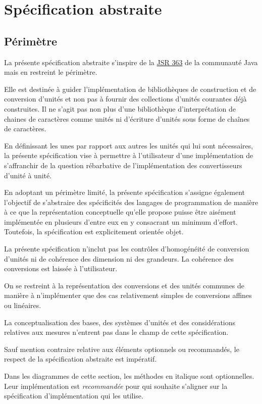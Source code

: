 \documentclass[a4paper,twoside,10pt]{article}
\begin{document}
\section{Spécification abstraite}

\subsection{Périmètre}

La présente spécification abstraite s'inspire de la \href{https://jcp.org/en/jsr/detail?id=363}{JSR 363} de la
communauté Java mais en restreint le périmètre.

Elle est destinée à guider l'implémentation de bibliothèques de construction et de conversion d'unités et non pas à
fournir des collections d'unités courantes déjà construites. Il ne s'agit pas non plus d'une bibliothèque
d'interprétation de chaines de caractères comme unités ni d'écriture d'unités sous forme de chaînes de caractères.

En définissant les unes par rapport aux autres les unités qui lui sont nécessaires, la présente spécification vise à
permettre à l'utilisateur d'une implémentation de s'affranchir de la question rébarbative de l'implémentation des
convertisseurs d'unité à unité.

En adoptant un périmètre limité, la présente spécification s'assigne également l'objectif de s'abstraire des
spécificités des langages de programmation de manière à ce que la représentation conceptuelle qu'elle propose puisse
être aisément implémentée en plusieurs d'entre eux en y consacrant un minimum d'effort. Toutefois, la spécification est
explicitement orientée objet.

La présente spécification n'inclut pas les contrôles d'homogénéité de conversion d'unités ni de cohérence des dimension
ni des grandeurs. La cohérence des conversions est laissée à l'utilisateur.

On se restreint à la représentation des conversions et des unités communes de manière à n'implémenter que des cas
relativement simples de conversions affines ou linéaires.

La conceptualisation des bases, des systèmes d'unités et des considérations relatives aux mesures n'entrent pas dans
le champ de cette spécification.

Sauf mention contraire relative aux éléments optionnels ou recommandés, le respect de la spécification abstraite est
impératif.

Dans les diagrammes de cette section, les méthodes en italique sont optionnelles. Leur implémentation est
\emph{recommandée} pour qui souhaite s'aligner sur la spécification d'implémentation qui les utilise.
\end{document}
